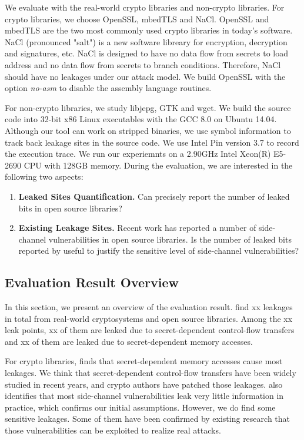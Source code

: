 We evaluate \tool{} with the real-world crypto libraries and non-crypto libraries. 
For crypto libraries, we choose OpenSSL, mbedTLS and NaCl. 
OpenSSL and mbedTLS are the two most commonly used
crypto libraries in today's software. NaCl (pronounced "salt") is a 
new software libreary for encryption, decryption and signatures, etc.
NaCl is designed to have no data flow from secrets to load address and no data 
flow from secrets to branch conditions. Therefore, NaCl should have no leakages
under our attack model. We build OpenSSL with the option \textit{no-asm} 
to disable the assembly language routines. 

For non-crypto libraries, we study libjepg, GTK and wget.
We build the source code into 32-bit x86 Linux executables with the 
GCC 8.0 on Ubuntu 14.04. Although our tool can
work on stripped binaries, we use symbol information to track
back leakage sites in the source code. We use Intel Pin version 3.7 
to record the execution trace. We run our experiemnts on a 2.90GHz
Intel Xeon(R) E5-2690 CPU with 128GB memory.
During the evaluation, we are interested in the following two
aspects:
\begin{enumerate}
    
    \item \textbf{Leaked Sites Quantification.} Can \tool{} precisely
    report the number of leaked bits in open source libraries?
    \item \textbf{Existing Leakage Sites.} Recent work has reported a number
    of side-channel vulnerabilities in open source libraries. 
    Is the number of leaked bits reported by \tool{} useful to justify 
    the sensitive level of side-channel vulnerabilities?
   
\end{enumerate}

\subsection{Evaluation Result Overview}
In this section, we present an overview of the evaluation result. 
\tool find xx leakages in total from real-world cryptosystems and open
source libraries. Among the xx leak points, xx of them are leaked due
to secret-dependent control-flow transfers and xx of them are leaked 
due to secret-dependent memory accesses. 

For crypto libraries, \tool finds that secret-dependent memory accesses 
cause most leakages. We think that secret-dependent
control-flow transfers have been widely studied in recent years, 
and crypto authors have patched those leakages.
\tool also identifies that most side-channel vulnerabilities 
leak very little information in practice, which confirms our initial
assumptions. 
However, we do find some sensitive leakages. 
Some of them have been confirmed by existing research that those 
vulnerabilities can be exploited
to realize real attacks. 

